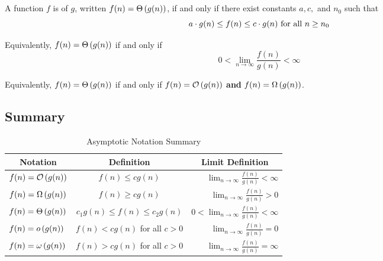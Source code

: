 \subsection{\texorpdfstring{\bigThName}{Big-Θ}}
\begin{definition}{\bigThName}{}
    A function $f$ is \bigThName of $g$, written $f(n)=\Theta\left(g(n)\right)$, if and only if there exist constants $a, c,$ and $n_0$ such that \[a\cdot g(n) \leq f(n)\leq c\cdot g(n)\hbox{ for all $n\geq n_0$}\]

    Equivalently, $f(n)=\Theta\left(g(n)\right)$ if and only if \[0 < \lim_{n\to\infty}\frac{f(n)}{g(n)}<\infty\]

    Equivalently, $f(n)=\Theta\left(g(n)\right)$ if and only if $f(n)=\mathcal{O}\left(g(n)\right)$ \textbf{and} $f(n)=\Omega\left(g(n)\right)$.
\end{definition}

\subsection{Summary}
\begin{table}[H]
    \centering
    \begin{tabular}{lcr}
        \multicolumn{1}{c}{Notation}           & \multicolumn{1}{c}{Definition}                & \multicolumn{1}{c}{Limit Definition}                            \\\toprule
        $\displaystyle f(n) = \mathcal{O}\left(g(n)\right)$     & $\displaystyle f(n)\leq cg(n)$                & $\displaystyle \lim_{n\to\infty}\frac{f(n)}{g(n)} < \infty$     \\\midrule
        $\displaystyle f(n) = \Omega\left(g(n)\right)$    & $\displaystyle f(n)\geq cg(n)$                & $\displaystyle \lim_{n\to\infty}\frac{f(n)}{g(n)} > 0$          \\\midrule
        $\displaystyle f(n) = \Theta\left(g(n)\right)$    & $\displaystyle c_1g(n) \leq f(n)\leq c_2g(n)$ & $\displaystyle 0 < \lim_{n\to\infty}\frac{f(n)}{g(n)} < \infty$ \\\midrule
        $\displaystyle f(n) = o\left(g(n)\right)$  & $\displaystyle f(n) < cg(n)$ for all $c>0$    & $\displaystyle \lim_{n\to\infty}\frac{f(n)}{g(n)} = 0$          \\\midrule
        $\displaystyle f(n) = \omega\left(g(n)\right)$ & $\displaystyle f(n) > cg(n)$ for all $c>0$    & $\displaystyle \lim_{n\to\infty}\frac{f(n)}{g(n)} = \infty$     \\\bottomrule
    \end{tabular}
    \caption{Asymptotic Notation Summary}
    \label{tbl:bigosummary}
\end{table}

